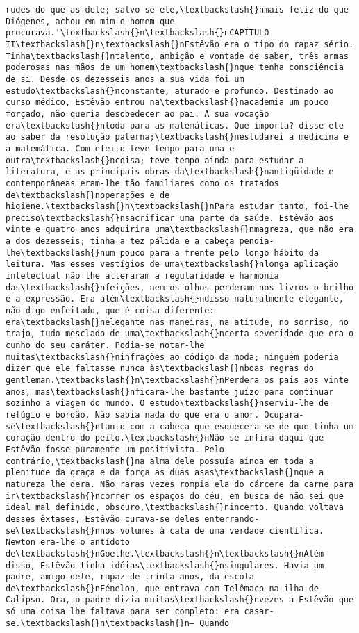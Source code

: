 \documentclass[11pt]{article}
\begin{document}
\begin{Verbatim}[commandchars=\\\{\}]
rudes do que as dele; salvo se ele,\textbackslash{}nmais feliz do que Diógenes, achou em mim o homem que procurava.'\textbackslash{}n\textbackslash{}nCAPÍTULO II\textbackslash{}n\textbackslash{}nEstêvão era o tipo do rapaz sério. Tinha\textbackslash{}ntalento, ambição e vontade de saber, três armas poderosas nas mãos de um homem\textbackslash{}nque tenha consciência de si. Desde os dezesseis anos a sua vida foi um estudo\textbackslash{}nconstante, aturado e profundo. Destinado ao curso médico, Estêvão entrou na\textbackslash{}nacademia um pouco forçado, não queria desobedecer ao pai. A sua vocação era\textbackslash{}ntoda para as matemáticas. Que importa? disse ele ao saber da resolução paterna;\textbackslash{}nestudarei a medicina e a matemática. Com efeito teve tempo para uma e outra\textbackslash{}ncoisa; teve tempo ainda para estudar a literatura, e as principais obras da\textbackslash{}nantigüidade e contemporâneas eram-lhe tão familiares como os tratados de\textbackslash{}noperações e de higiene.\textbackslash{}n\textbackslash{}nPara estudar tanto, foi-lhe preciso\textbackslash{}nsacrificar uma parte da saúde. Estêvão aos vinte e quatro anos adquirira uma\textbackslash{}nmagreza, que não era a dos dezesseis; tinha a tez pálida e a cabeça pendia-lhe\textbackslash{}num pouco para a frente pelo longo hábito da leitura. Mas esses vestígios de uma\textbackslash{}nlonga aplicação intelectual não lhe alteraram a regularidade e harmonia das\textbackslash{}nfeições, nem os olhos perderam nos livros o brilho e a expressão. Era além\textbackslash{}ndisso naturalmente elegante, não digo enfeitado, que é coisa diferente: era\textbackslash{}nelegante nas maneiras, na atitude, no sorriso, no trajo, tudo mesclado de uma\textbackslash{}ncerta severidade que era o cunho do seu caráter. Podia-se notar-lhe muitas\textbackslash{}ninfrações ao código da moda; ninguém poderia dizer que ele faltasse nunca às\textbackslash{}nboas regras do gentleman.\textbackslash{}n\textbackslash{}nPerdera os pais aos vinte anos, mas\textbackslash{}nficara-lhe bastante juízo para continuar sozinho a viagem do mundo. O estudo\textbackslash{}nserviu-lhe de refúgio e bordão. Não sabia nada do que era o amor. Ocupara-se\textbackslash{}ntanto com a cabeça que esquecera-se de que tinha um coração dentro do peito.\textbackslash{}nNão se infira daqui que Estêvão fosse puramente um positivista. Pelo contrário,\textbackslash{}na alma dele possuía ainda em toda a plenitude da graça e da força as duas asas\textbackslash{}nque a natureza lhe dera. Não raras vezes rompia ela do cárcere da carne para ir\textbackslash{}ncorrer os espaços do céu, em busca de não sei que ideal mal definido, obscuro,\textbackslash{}nincerto. Quando voltava desses êxtases, Estêvão curava-se deles enterrando-se\textbackslash{}nnos volumes à cata de uma verdade científica. Newton era-lhe o antídoto de\textbackslash{}nGoethe.\textbackslash{}n\textbackslash{}nAlém disso, Estêvão tinha idéias\textbackslash{}nsingulares. Havia um padre, amigo dele, rapaz de trinta anos, da escola de\textbackslash{}nFénelon, que entrava com Telêmaco na ilha de Calipso. Ora, o padre dizia muitas\textbackslash{}nvezes a Estêvão que só uma coisa lhe faltava para ser completo: era casar-se.\textbackslash{}n\textbackslash{}n— Quando 
\end{Verbatim}
\end{document}
